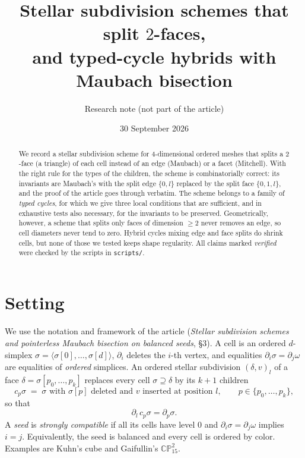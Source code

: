 \documentclass[11pt]{article}
\title{\bf Stellar subdivision schemes that split $2$-faces,\\ and typed-cycle hybrids with Maubach bisection}
\author{Research note (not part of the article)}
\date{30 September 2026}
\theoremstyle{plain}
\theoremstyle{definition}
\theoremstyle{remark}
\newcommand{\CP}{\mathbb{CP}}
\begin{document}
\maketitle

\begin{abstract}
We record a stellar subdivision scheme for $4$-dimensional ordered meshes
that splits a $2$-face (a triangle) of each cell instead of an edge
(Maubach) or a facet (Mitchell). With the right rule for the types of the
children, the scheme is combinatorially correct: its invariants are
Maubach's with the split edge $\{0,l\}$ replaced by the split face
$\{0,1,l\}$, and the proof of the article goes through verbatim. The
scheme belongs to a family of \emph{typed cycles}, for which we give three
local conditions that are sufficient, and in exhaustive tests also
necessary, for the invariants to be preserved. Geometrically, however, a
scheme that splits only faces of dimension $\ge2$ never removes an edge,
so cell diameters never tend to zero. Hybrid cycles mixing edge and face
splits do shrink cells, but none of those we tested keeps shape
regularity. All claims marked \emph{verified} were checked by the
scripts in \texttt{scripts/}.
\end{abstract}

\section{Setting}

We use the notation and framework of the article
(\emph{Stellar subdivision schemes and pointerless Maubach bisection on
balanced seeds}, \S3). A cell is an ordered $d$-simplex
$\sigma=\langle\sigma[0],\dots,\sigma[d]\rangle$, $\partial_i$ deletes the
$i$-th vertex, and equalities $\partial_i\sigma=\partial_j\omega$ are
equalities of \emph{ordered} simplices. An ordered stellar subdivision
$(\delta,v)_l$ of a face $\delta=\sigma[p_0,\dots,p_k]$ replaces every cell
$\sigma\supseteq\delta$ by its $k+1$ children
\[
  c_p\sigma \;=\; \text{$\sigma$ with $\sigma[p]$ deleted and $v$ inserted at position $l$},\qquad p\in\{p_0,\dots,p_k\},
\]
so that
\begin{equation}\label{eq:outer}
  \partial_l\,c_p\sigma=\partial_p\sigma .
\end{equation}
A \emph{seed} is \emph{strongly compatible} if all its cells have level $0$
and $\partial_i\sigma=\partial_j\omega$ implies $i=j$. Equivalently, the
seed is balanced and every cell is ordered by color. Examples are Kuhn's
cube and Gaifullin's $\CP^2_{15}$.
\end{document}
